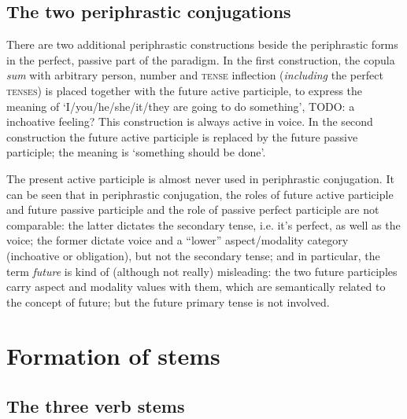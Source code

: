 \documentclass[a4paper, oneside, 12pt]{report}
\newcommand*{\term}[1]{\emph{#1}}
\newcommand{\form}[1]{\emph{#1}}
\newcommand*{\category}[1]{\textsc{#1}}
\newcommand{\translate}[1]{`#1'}
\begin{document}
\subsection{The two periphrastic conjugations}

There are two additional periphrastic constructions 
beside the periphrastic forms in the perfect, passive part of the paradigm.
In the first construction, 
the copula \form{sum} with arbitrary person, number and \category{tense} inflection 
(\emph{including} the perfect \category{tenses})
is placed together with the future active participle,
to express the meaning of \translate{I/you/he/she/it/they are going to do something}, 
TODO: a inchoative feeling?
This construction is always active in voice.
In the second construction the future active participle is replaced by the future passive participle;
the meaning is \translate{something should be done}.

The present active participle is almost never used in periphrastic conjugation.
It can be seen that in periphrastic conjugation,
the roles of future active participle and future passive participle 
and the role of passive perfect participle 
are not comparable:
the latter dictates the secondary tense, i.e. it's perfect, 
as well as the voice;
the former dictate voice and a ``lower'' aspect/modality category 
(inchoative or obligation),
but not the secondary tense;
and in particular, the term \term{future} is kind of (although not really) misleading:
the two future participles carry aspect and modality values with them, 
which are semantically related to the concept of future; 
but the future primary tense is not involved.

\section{Formation of stems}\label{sec:verb-inflection.stem}

\subsection{The three verb stems}\label{sec:three-latin-stem}
\end{document}
